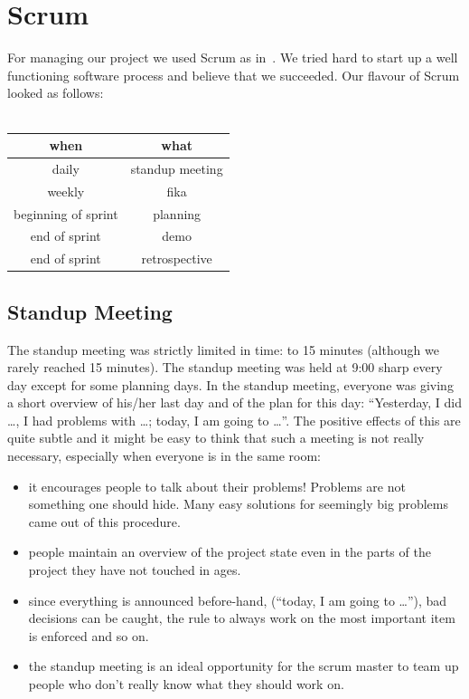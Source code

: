 \documentclass[11pt,a4paper]{report}
\begin{document}
\section{Scrum}
For managing our project we used Scrum as in~\cite{kniberg}.
We tried hard to start up a well functioning software process and believe that
we succeeded. Our flavour of Scrum looked as follows: \\ \\
\begin{tabular}{cc}
  when & what \\ \hline
  daily & standup meeting\\
  weekly & fika \\
  beginning of sprint & planning \\
  end of sprint & demo \\
  end of sprint & retrospective \\
\end{tabular}

\subsection{Standup Meeting}
The standup meeting was strictly limited in time: to 15 minutes (although we
rarely reached 15 minutes). The standup meeting was held at 9:00 sharp every day
except for some planning days. In the standup meeting, everyone was giving a
short overview of his/her last day and of the plan for this day: ``Yesterday, I
did \ldots, I had problems with \ldots; today, I am going to \ldots''.
The positive effects of this are quite subtle and it might be easy to think that
such a meeting is not really necessary, especially when everyone is in the same
room:\\
\begin{itemize}
\item it encourages people to talk about their problems!
  Problems are not something one should hide. Many easy solutions for seemingly
  big problems came out of this procedure.
\item people maintain an overview of the project state even in the parts of the
  project they have not touched in ages.
\item since everything is announced before-hand,
  (``today, I am going to \ldots''), bad decisions can be caught, the rule to
  always work on the most important item is enforced and so on.
\item the standup meeting is an ideal opportunity for the scrum master to team
  up people who don't really know what they should work on.
\end{itemize}
\end{document}
